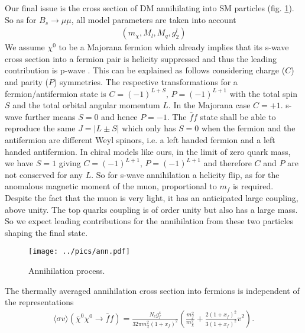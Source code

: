 Our final issue is the cross section of DM annihilating into SM particles (fig. \ref{pic_annihilation}). So as for $B_s\rightarrow \mu\mu$, all model parameters are taken into
account
\begin{align}
 \left(m_\chi, M_l, M_q, g^l_2\right)
\end{align}
We assume $\chi^0$ to be a Majorana fermion which already implies that its s-wave cross section into a fermion pair is helicity suppressed and 
thus the leading contribution is p-wave \cite{1307.8120}. This can be explained as follows considering charge ($C$) and parity ($P$) symmetries.
The respective transformations for a fermion/antifermion state is $C=(-1)^{L+S},\,P=(-1)^{L+1}$ with the total spin $S$ and the total orbital angular
momentum $L$. 
In the Majorana case $C=+1$. s-wave further means $S=0$ and hence $P=-1$. The $\bar f f$ state shall be able to reproduce the same $J=|L\pm S|$ 
which only has $S=0$ when the fermion and the antifermion are different Weyl spinors, i.e. a left handed fermion and a left handed antifermion.
In chiral models like ours, in the limit of zero quark mass, we have $S=1$ giving $C=(-1)^{L+1},\,P=(-1)^{L+1}$ and therefore $C$ and $P$ are not 
conserved for any $L$. So for s-wave annihilation a helicity flip, as for the anomalous magnetic moment of the muon, proportional to $m_f$ is 
required. Despite the fact that the muon is very light, it has an anticipated large coupling, above unity. The top quarks coupling is of order unity
but also has a large mass. So we expect leading contributions for the annihilation from these two particles shaping the final state.
\begin{figure}[t]
 \texttt{[image: ../pics/ann.pdf]}
 \caption{Annihilation process.}
 \label{pic_annihilation}
\end{figure}
The thermally averaged annihilation cross section into fermions is independent of the representations \cite{1503.01500}
\begin{align}
 \langle \sigma v \rangle \left(\bar \chi^0 \chi^0 \rightarrow \bar f f\right) = \frac{N_c g_f^4}{32\pi m_\chi^2\left(1+x_f\right)^2} \left(\frac{m_f^2}{m_\chi^2} + \frac{2\left(1+x_f\right)^2}{3\left(1+x_f\right)^2} v^2\right)  .
\end{align}
